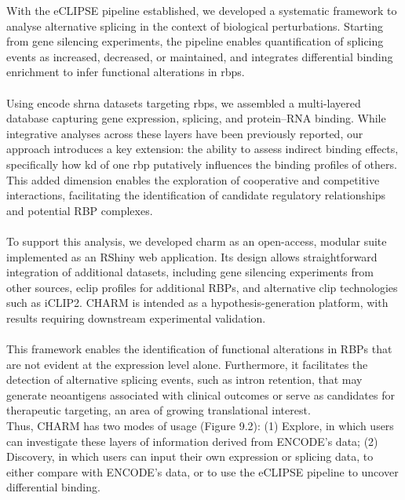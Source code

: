 With the eCLIPSE pipeline established, we developed a systematic framework to analyse alternative splicing in the context of biological perturbations. Starting from gene silencing experiments, the pipeline enables quantification of splicing events as increased, decreased, or maintained, and integrates differential binding enrichment to infer functional alterations in \glspl{rbp}.
\\
\\
Using \gls{encode} \gls{shrna} datasets targeting \glspl{rbp}, we assembled a multi-layered database capturing gene expression, splicing, and protein–RNA binding. While integrative analyses across these layers have been previously reported\cite{rogalska_transcriptome-wide_2024}, our approach introduces a key extension: the ability to assess indirect binding effects, specifically how \gls{kd} of one \gls{rbp} putatively influences the binding profiles of others. This added dimension enables the exploration of cooperative and competitive interactions, facilitating the identification of candidate regulatory relationships and potential RBP complexes.
\\
\\
To support this analysis, we developed \gls{charm} as an open-access, modular suite implemented as an RShiny web application. Its design allows straightforward integration of additional datasets, including gene silencing experiments from other sources, \gls{eclip} profiles for additional RBPs, and alternative \gls{clip} technologies such as iCLIP2\cite{buchbender_improved_2020}. CHARM is intended as a hypothesis-generation platform, with results requiring downstream experimental validation.
\\
\\
This framework enables the identification of functional alterations in RBPs that are not evident at the expression level alone. Furthermore, it facilitates the detection of alternative splicing events, such as intron retention, that may generate neoantigens associated with clinical outcomes or serve as candidates for therapeutic targeting, an area of growing translational interest\cite{rogalska_regulation_2023}.
\\
\linebreak
\noindent
Thus, CHARM has two modes of usage (Figure 9.2): (1) Explore, in which users can investigate these layers of information derived from ENCODE's data\cite{the_encode_project_consortium_integrated_2012}; (2) Discovery, in which users can input their own expression or splicing data, to either compare with ENCODE's data\cite{the_encode_project_consortium_integrated_2012}, or to use the eCLIPSE pipeline to uncover differential binding.
\\

